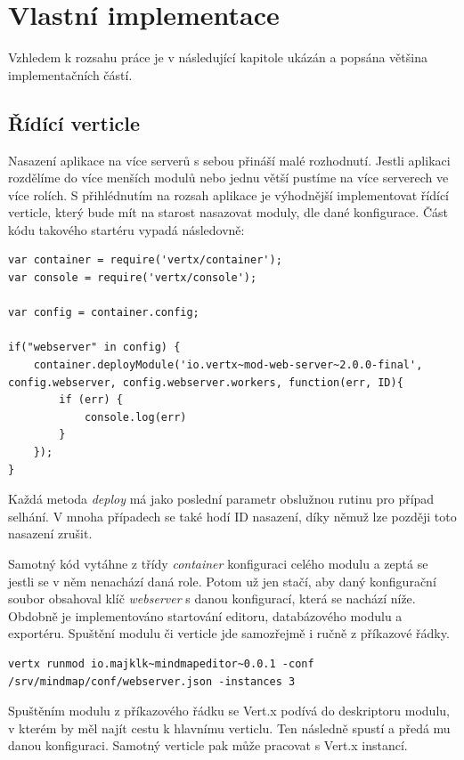 \section{Vlastní implementace}

Vzhledem k rozsahu práce je v následující kapitole ukázán a popsána většina implementačních částí.

\subsection{Řídící verticle}

Nasazení aplikace na více serverů s sebou přináší malé rozhodnutí. Jestli aplikaci rozdělíme do více menších modulů nebo jednu větší pustíme na více serverech ve více rolích. S přihlédnutím na rozsah aplikace je výhodnější implementovat řídící verticle, který bude mít na starost nasazovat moduly, dle dané konfigurace. Část kódu takového startéru vypadá následovně:

\begin{lstlisting}[caption=Řídící verticle]
var container = require('vertx/container');
var console = require('vertx/console');

var config = container.config;

if("webserver" in config) {
	container.deployModule('io.vertx~mod-web-server~2.0.0-final', config.webserver, config.webserver.workers, function(err, ID){
		if (err) {
			console.log(err)
		}
	});
}
\end{lstlisting}

Každá metoda \emph{deploy} má jako poslední parametr obslužnou rutinu pro případ selhání. V mnoha případech se také hodí ID nasazení, díky němuž lze později toto nasazení zrušit.

Samotný kód vytáhne z třídy \emph{container} konfiguraci celého modulu a zeptá se jestli se v něm nenachází daná role. Potom už jen stačí, aby daný konfigurační soubor obsahoval klíč \emph{webserver} s danou konfigurací, která se nachází níže. Obdobně je implementováno startování editoru, databázového modulu a exportéru. Spuštění modulu či verticle jde samozřejmě i ručně z příkazové řádky.

\begin{lstlisting}[caption=Spuštění modulu z příkazové řádky]
vertx runmod io.majklk~mindmapeditor~0.0.1 -conf /srv/mindmap/conf/webserver.json -instances 3
\end{lstlisting}

Spuštěním modulu z příkazového řádku se Vert.x podívá do deskriptoru modulu, v kterém by měl najít cestu k hlavnímu verticlu. Ten následně spustí a předá mu danou konfiguraci. Samotný verticle pak může pracovat s Vert.x instancí.

